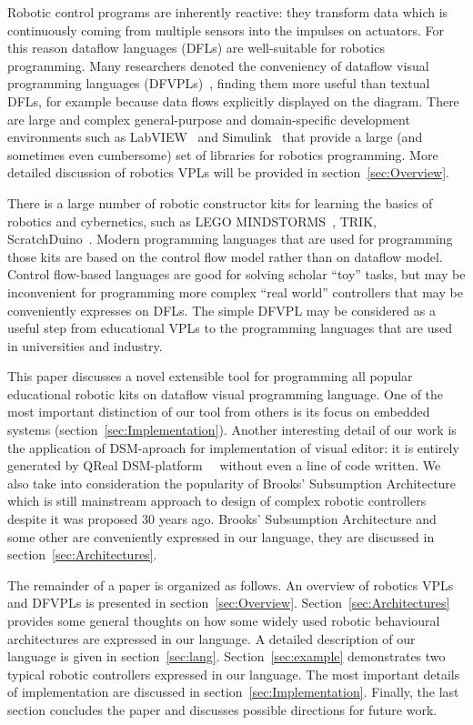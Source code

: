 \documentclass[conference,compsoc]{IEEEtran}
\begin{document}
Robotic control programs are inherently reactive: they transform data which is continuously coming from multiple sensors into the impulses on actuators. For this reason dataflow languages (DFLs) are well-suitable for robotics programming. Many researchers denoted the conveniency of dataflow visual programming languages (DFVPLs)~\cite{johnston2004advances}, finding them more useful than textual DFLs, for example because data flows explicitly displayed on the diagram. There are large and complex general-purpose and domain-specific development environments such as LabVIEW~\cite{labview} and Simulink~\cite{simulink} that provide a large (and sometimes even cumbersome) set of libraries for robotics programming. More detailed discussion of robotics VPLs will be provided in section~\ref{sec:Overview}.

There is a large number of robotic constructor kits for learning the basics of robotics and cybernetics, such as LEGO MINDSTORMS~\cite{legokit}, TRIK, ScratchDuino~\cite{ScratchDuino}. Modern programming languages that are used for programming those kits are based on the control flow model rather than on dataflow model. Control flow-based languages are good for solving scholar ``toy'' tasks, but may be inconvenient for programming more complex ``real world'' controllers that may be conveniently expresses on DFLs. The simple DFVPL may be considered as a useful step from educational VPLs to the programming languages that are used in universities and industry. 


This paper discusses a novel extensible tool for programming all popular educational robotic kits on dataflow visual programming language. One of the most important distinction of our tool from others is its focus on embedded systems (section~\ref{sec:Implementation}). Another interesting detail of our work is the application of DSM-aproach for implementation of visual editor: it is entirely generated by QReal DSM-platform~\cite{qrealMeta}~\cite{kuzenkova2013qreal} without even a line of code written. We also take into consideration the popularity of Brooks' Subsumption Architecture~\cite{brooks1986robust} which is still mainstream approach to design of complex robotic controllers~\cite{banyasad2000visual,simpson2006mobile,posso2011process,proetzsch2007behaviour} despite it was proposed 30 years ago. Brooks' Subsumption Architecture and some other are conveniently expressed in our language, they are discussed in section~\ref{sec:Architectures}.

The remainder of a paper is organized as follows. An overview of robotics VPLs and DFVPLs is presented in section~\ref{sec:Overview}. Section~\ref{sec:Architectures} provides some general thoughts on how some widely used robotic behavioural architectures are expressed in our language. A detailed description of our language is given in section~\ref{sec:lang}. Section~\ref{sec:example} demonstrates two typical robotic controllers expressed in our language. The most important details of implementation are discussed in section~\ref{sec:Implementation}. Finally, the last section concludes the paper and discusses possible directions for future work.
\end{document}
